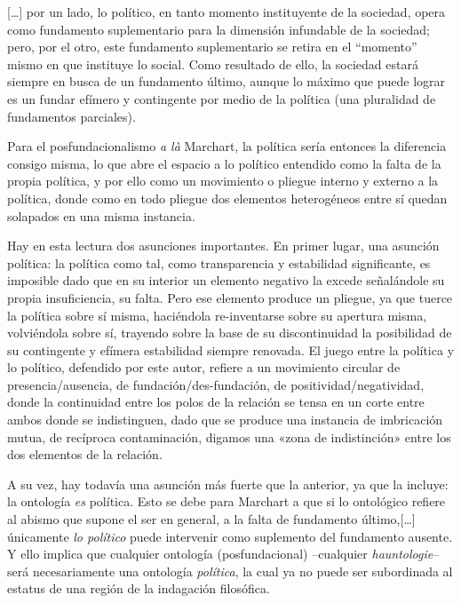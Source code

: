 {[}\ldots{]} por un lado, lo político, en tanto momento instituyente de la sociedad, opera como fundamento suplementario para la dimensión infundable de la sociedad; pero, por el otro, este fundamento suplementario se retira en el ``momento'' mismo en que instituye lo social. Como resultado de ello, la sociedad estará siempre en busca de un fundamento último, aunque lo máximo que puede lograr es un fundar efímero y contingente por medio de la política (una pluralidad de fundamentos parciales).

Para el posfundacionalismo \emph{a là} Marchart, la política sería entonces la diferencia consigo misma, lo que abre el espacio a lo político entendido como la falta de la propia política, y por ello como un movimiento o pliegue interno y externo a la política, donde como en todo pliegue dos elementos heterogéneos entre sí quedan solapados en una misma instancia.

Hay en esta lectura dos asunciones importantes. En primer lugar, una asunción política: la política como tal, como transparencia y estabilidad significante, es imposible dado que en su interior un elemento negativo la excede señalándole su propia insuficiencia, su falta. Pero ese elemento produce un pliegue, ya que tuerce la política sobre sí misma, haciéndola re-inventarse sobre su apertura misma, volviéndola sobre sí, trayendo sobre la base de su discontinuidad la posibilidad de su contingente y efímera estabilidad siempre renovada. El juego entre la política y lo político, defendido por este autor, refiere a un movimiento circular de presencia/ausencia, de fundación/des-fundación, de positividad/negatividad, donde la continuidad entre los polos de la relación se tensa en un corte entre ambos donde se indistinguen, dado que se produce una instancia de imbricación mutua, de recíproca contaminación, digamos una «zona de indistinción» entre los dos elementos de la relación.

A su vez, hay todavía una asunción más fuerte que la anterior, ya que la incluye: la ontología \emph{es} política. Esto se debe para Marchart a que si lo ontológico refiere al abismo que supone el ser en general, a la falta de fundamento último,{[}\ldots{]} únicamente \emph{lo político }puede intervenir como suplemento del fundamento ausente. Y ello implica que cualquier ontología (posfundacional) --cualquier \emph{hauntologie}-- será necesariamente una ontología \emph{política}, la cual ya no puede ser subordinada al estatus de una región de la indagación filosófica.

